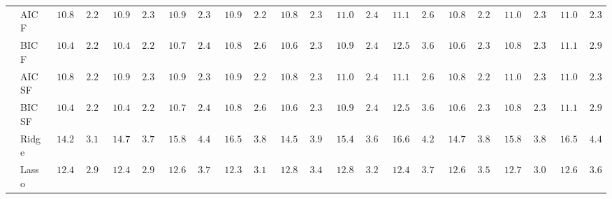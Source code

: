 \begin{tabular}{ll|ll|llllll|llllll|llllll}
 & AIC F  & $\phantom{0}10.88$ & $\phantom{0}2.22$ & $\phantom{0}10.92$ & $\phantom{0}2.34$ & $\phantom{0}10.94$ & $\phantom{0}2.31$ & $\phantom{0}10.90$ & $\phantom{0}2.26$ & $\phantom{0}10.83$ & $\phantom{0}2.34$ & $\phantom{0}11.07$ & $\phantom{0}2.45$ & $\phantom{0}11.15$ & $\phantom{0}2.63$ & $\phantom{0}10.88$ & $\phantom{0}2.24$ & $\phantom{0}11.00$ & $\phantom{0}2.33$ & $\phantom{0}11.00$ & $\phantom{0}2.31$ \\
 & BIC F  & $\phantom{0}10.43$ & $\phantom{0}2.27$ & $\phantom{0}10.49$ & $\phantom{0}2.25$ & $\phantom{0}10.75$ & $\phantom{0}2.47$ & $\phantom{0}10.81$ & $\phantom{0}2.63$ & $\phantom{0}10.61$ & $\phantom{0}2.35$ & $\phantom{0}10.90$ & $\phantom{0}2.41$ & $\phantom{0}12.52$ & $\phantom{0}3.69$ & $\phantom{0}10.62$ & $\phantom{0}2.30$ & $\phantom{0}10.82$ & $\phantom{0}2.31$ & $\phantom{0}11.17$ & $\phantom{0}2.98$ \\
 & AIC SF  & $\phantom{0}10.88$ & $\phantom{0}2.22$ & $\phantom{0}10.92$ & $\phantom{0}2.34$ & $\phantom{0}10.94$ & $\phantom{0}2.31$ & $\phantom{0}10.90$ & $\phantom{0}2.26$ & $\phantom{0}10.81$ & $\phantom{0}2.31$ & $\phantom{0}11.07$ & $\phantom{0}2.46$ & $\phantom{0}11.15$ & $\phantom{0}2.68$ & $\phantom{0}10.88$ & $\phantom{0}2.24$ & $\phantom{0}11.02$ & $\phantom{0}2.36$ & $\phantom{0}11.01$ & $\phantom{0}2.31$ \\
 & BIC SF  & $\phantom{0}10.43$ & $\phantom{0}2.27$ & $\phantom{0}10.49$ & $\phantom{0}2.25$ & $\phantom{0}10.73$ & $\phantom{0}2.44$ & $\phantom{0}10.81$ & $\phantom{0}2.63$ & $\phantom{0}10.61$ & $\phantom{0}2.35$ & $\phantom{0}10.90$ & $\phantom{0}2.41$ & $\phantom{0}12.52$ & $\phantom{0}3.69$ & $\phantom{0}10.62$ & $\phantom{0}2.30$ & $\phantom{0}10.81$ & $\phantom{0}2.30$ & $\phantom{0}11.17$ & $\phantom{0}2.98$ \\
 & Ridge  & $\phantom{0}14.28$ & $\phantom{0}3.13$ & $\phantom{0}14.76$ & $\phantom{0}3.73$ & $\phantom{0}15.83$ & $\phantom{0}4.41$ & $\phantom{0}16.52$ & $\phantom{0}3.86$ & $\phantom{0}14.53$ & $\phantom{0}3.95$ & $\phantom{0}15.46$ & $\phantom{0}3.63$ & $\phantom{0}16.69$ & $\phantom{0}4.26$ & $\phantom{0}14.76$ & $\phantom{0}3.81$ & $\phantom{0}15.83$ & $\phantom{0}3.86$ & $\phantom{0}16.58$ & $\phantom{0}4.47$ \\
 & Lasso  & $\phantom{0}12.45$ & $\phantom{0}2.93$ & $\phantom{0}12.43$ & $\phantom{0}2.98$ & $\phantom{0}12.60$ & $\phantom{0}3.77$ & $\phantom{0}12.33$ & $\phantom{0}3.19$ & $\phantom{0}12.80$ & $\phantom{0}3.49$ & $\phantom{0}12.88$ & $\phantom{0}3.21$ & $\phantom{0}12.48$ & $\phantom{0}3.71$ & $\phantom{0}12.67$ & $\phantom{0}3.50$ & $\phantom{0}12.74$ & $\phantom{0}3.02$ & $\phantom{0}12.63$ & $\phantom{0}3.64$ \\

\end{tabular}
